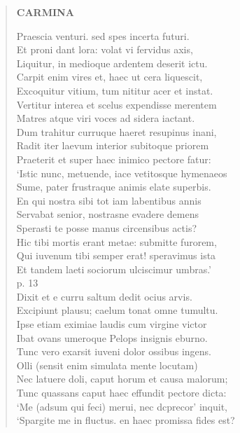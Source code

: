\documentclass[11pt, a4paper]{report}
\begin{document}
\begin{verse}
     \marginpar{[46]} \begin{center} \textbf{CARMINA} \end{center}Praescia venturi. sed spes incerta futuri. \\ Et proni dant lora: volat vi fervidus axis, \\ Liquitur, in medioque ardentem deserit ictu. \\ Carpit enim vires et, haec ut cera liquescit, \\ Excoquitur vitium, tum nititur acer et instat. \\ Vertitur interea et scelus expendisse merentem \\ Matres atque viri voces ad sidera iactant. \\ Dum trahitur curruque haeret resupinus inani, \\ Radit iter laevum interior subitoque priorem \\ Praeterit et super haec inimico pectore fatur: \\ ‘Istic nunc, metuende, iace vetitosque hymenaeos \\ Sume, pater frustraque animis elate superbis. \\ En qui nostra sibi tot iam labentibus annis \\ Servabat senior, nostrasne evadere demens \\ Sperasti te posse manus circensibus actis? \\ Hic tibi mortis erant metae: submitte furorem, \\ Qui iuvenum tibi semper erat! speravimus ista \\ Et tandem laeti sociorum ulciscimur umbras.’ \\ p. 13 \\ Dixit et e curru saltum dedit ocius arvis. \\ Excipiunt plausu; caelum tonat omne tumultu. \\ Ipse etiam eximiae laudis cum virgine victor \\ Ibat ovans umeroque Pelops insignis eburno. \\ Tunc vero exarsit iuveni dolor ossibus ingens. \\ Olli (sensit enim simulata mente locutam) \\ Nec latuere doli, caput horum et causa malorum; \\ Tunc quassans caput haec effundit pectore dicta: \\ ‘Me (adsum qui feci) merui, nec dcprecor’ inquit, \\ ‘Spargite  \lbrack me \rbrack  in fluctus. en haec promissa fides est? \\ 

\end{verse}
\end{document}
